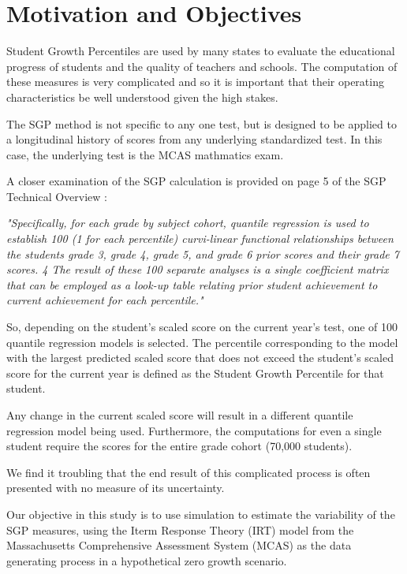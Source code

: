 \documentclass[reqno,12pt]{amsart}
\theoremstyle{plain}
\numberwithin{equation}{section} %
\numberwithin{figure}{section} %
\theoremstyle{remark}
\begin{document}
\section{Motivation and Objectives}
Student Growth Percentiles are used by many states to evaluate the educational progress of students and the quality of teachers and schools.  The computation of these measures is very complicated and so it is important that their operating characteristics be well understood given the high stakes.    
\par\vspace{0.3 cm}
The SGP method is not specific to any one test, but is designed to be applied to a longitudinal history of scores from any underlying standardized test.  In this case, the underlying test is the MCAS mathmatics exam. 
\par\vspace{0.3 cm}
A closer examination of the SGP calculation is provided on page 5 of the SGP Technical Overview \cite{bb3}:
\par\vspace{0.3 cm}
\textit{"Specifically, for each grade by subject cohort, quantile
regression is used to establish 100 (1 for each percentile) curvi-linear functional relationships between
the students grade 3, grade 4, grade 5, and grade 6 prior scores and their grade 7 scores. 4 The result
of these 100 separate analyses is a single coefficient matrix that can be employed as a look-up table
relating prior student achievement to current achievement for each percentile."}   
\par\vspace{0.3 cm}
So, depending on the student's scaled score on the current year's test, one of 100 quantile regression models is selected.  The percentile corresponding to the model with the largest predicted scaled score that does not exceed the student's scaled score for the current year is defined as the Student Growth Percentile for that student. 
\par\vspace{0.3 cm}
Any change in the current scaled score will result in a different quantile regression model being used.  Furthermore, the computations for even a single student require the scores for the entire grade cohort (70,000 students).  
\par\vspace{0.3 cm}

We find it troubling that the end result of this complicated process is often presented with no measure of its uncertainty. 
\par\vspace{0.3 cm}
Our objective in this study is to use simulation to estimate the variability of the SGP measures, using the Iterm Response Theory (IRT) model from the Massachusetts Comprehensive Assessment System (MCAS) as the data generating process in a hypothetical zero growth scenario.
\par\vspace{0.3 cm}
\end{document}
